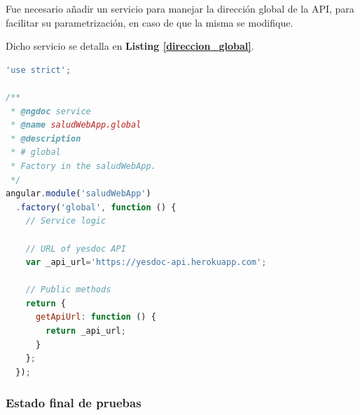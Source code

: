 Fue necesario añadir un servicio para manejar la dirección global de la API, para facilitar su parametrización, en caso de que la misma se modifique.

Dicho servicio se detalla en \textbf{Listing \ref{direccion_global}}.

\begin{lstlisting}[language=JavaScript, caption=Servicio de la dirección global de la API, label=direccion_global]
'use strict';                                                                   
                                                                                
/**                                                                             
 * @ngdoc service                                                               
 * @name saludWebApp.global                                                     
 * @description                                                                 
 * # global                                                                     
 * Factory in the saludWebApp.                                                  
 */                                                                             
angular.module('saludWebApp')                                                   
  .factory('global', function () {                                              
    // Service logic                                                               
                                                                                
    // URL of yesdoc API                                                           
    var _api_url='https://yesdoc-api.herokuapp.com';                               
                                                                                   
    // Public methods                                                              
    return {                                                                       
      getApiUrl: function () {                                                     
        return _api_url;                                                           
      }                                                                            
    };                                                                             
  });                                                       
\end{lstlisting}


\subsubsection{Estado final de pruebas}

